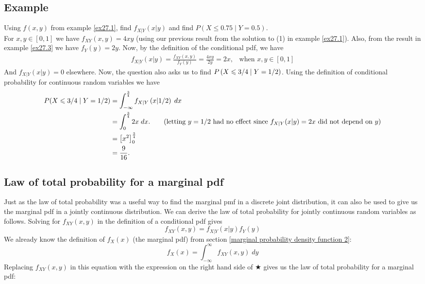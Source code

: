 \subsection{Example} \label{ex27.5}
Using $f(x,y)$ from example \ref{ex27.1}, find $f_{X|Y}(x|y)$ and find $P(X \leq 0.75 \mid Y = 0.5)$. \\

\solution
For $x,y \in [0,1]$ we have $f_{XY}(x,y) = 4xy$ (using our previous result from the solution to (1) in example \ref{ex27.1}). Also, from the result in example \ref{ex27.3} we have $f_Y(y) = 2y$. Now, by the definition of the conditional pdf, we have
\begin{align*}
f_{X|Y}(x|y) = \frac{f_{XY}(x,y)}{f_Y(y)} = \frac{4xy}{2y} = 2x, \;\;\; \text{when $x,y \in [0,1]$}
\end{align*}
And $f_{X|Y}(x|y) = 0$ elsewhere. Now, the question also asks us to find $P\left(X \leqslant 3/4 \mid Y = 1/2\right)$. Using the definition of conditional probability for continuous random variables we have
\begin{align*}
P(X \leq 3/4 \mid Y = 1/2) & = \int_{-\infty}^\frac{3}{4} f_{X|Y}\brac{x|1/2} \; dx \\
	& = \int_{0}^\frac{3}{4} 2x \; dx. \tag{letting $y = 1/2$ had no effect since $f_{X|Y}(x|y) = 2x$ did not depend on $y$} \\
	& = \squac{x^2}_0^\frac{3}{4} \\
	& = \frac{9}{16}.
\end{align*}

\subsection{Law of total probability for a marginal pdf}
Just as the law of total probability was a useful way to find the marginal pmf in a discrete joint distribution, it can also be used to give us the marginal pdf in a jointly continuous distribution. We can derive the law of total probability for jointly continuous random variables as follows. Solving for $f_{XY}(x,y)$ in the definition of a conditional pdf gives
\[
f_{XY}(x,y) = f_{X|Y}(x|y)f_Y(y) \tag{$\bigstar$}
\]
\noindent We already know the definition of $f_X(x)$ (the marginal pdf) from section \ref{marginal probability density function 2}:
\[
f_{X}(x) = \int_{-\infty}^\infty f_{XY}(x,y) \; dy
\]
Replacing $f_{XY}(x,y)$ in this equation with the expression on the right hand side of $\bigstar$ gives us the law of total probability for a marginal pdf:

